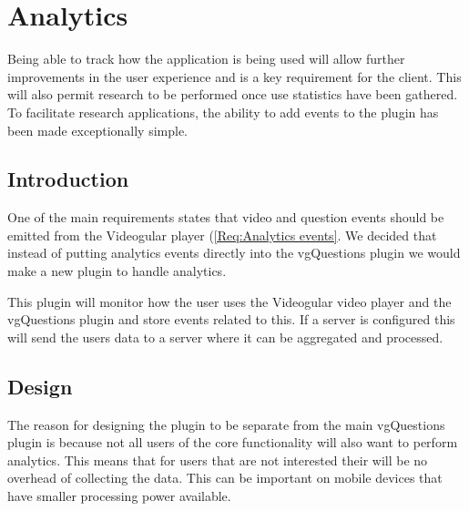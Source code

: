 
\chapter{Analytics} \label{Chapter: Analytics}

\begin{preamble}
	Being able to track how the application is being used will allow further improvements in the user experience and is a key requirement for the client. This will also permit research to be performed once use statistics have been gathered. To facilitate research applications, the ability to add events to the plugin has been made exceptionally simple.
\end{preamble}

\section{Introduction}

One of the main requirements states  that video and question events should be emitted from the Videogular player (\cref{Req:Analytics events}. We decided that instead of putting analytics events directly into the \gls{vgQuestions} plugin we would make a new plugin to handle analytics.

This plugin will monitor how the user uses the \gls{Videogular} video player and the \gls{vgQuestions} plugin and store events related to this. If a server is configured this will send the users data to a server where it can be aggregated and processed.

\section{Design}

The reason for designing the plugin to be separate from the main \gls{vgQuestions} plugin is because not all users of the core functionality will also want to perform analytics. This means that for users that are not interested their will be no overhead of collecting the data. This can be important on mobile devices that have smaller processing power available.

